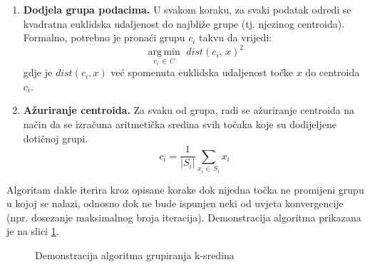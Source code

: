 \documentclass[times, utf8, zavrsni]{fer}
\begin{document}
\begin{enumerate}
\item \textbf{Dodjela grupa podacima.} U svakom koraku, za svaki podatak odredi se kvadratna euklidska udaljenost do najbliže grupe (tj. njezinog centroida). Formalno, potrebno je pronaći grupu $c_{i}$ takvu da vrijedi:
\begin{equation}
{\displaystyle {\underset{{c_i}\,\in\,C}{\operatorname {arg\,min}}}\,\,dist({c_i},\,x)^2}
\end{equation}
gdje je $dist(c_i, x)$ već spomenuta euklidska udaljenost točke $x$ do centroida $c_i$.
\item \textbf{Ažuriranje centroida.} Za svaku od grupa, radi se ažuriranje centroida na način da se izračuna aritmetička sredina svih točaka koje su dodijeljene dotičnoj grupi.
\begin{equation}
{\displaystyle {c_i}}=\frac{1}{|S_i|} \sum_{x_i\in\,S_i}^{} x_i
\end{equation}
\end{enumerate}
Algoritam dakle iterira kroz opisane korake dok nijedna točka ne promijeni grupu u kojoj se nalazi, odnosno dok ne bude ispunjen neki od uvjeta konvergencije (npr. dosezanje maksimalnog broja iteracija). Demonstracija algoritma prikazana je na slici
\ref{img:clustering_alg}.

\begin{figure}
\caption{Demonstracija algoritma grupiranja k-sredina}
\label{img:clustering_alg}
\end{figure}
\end{document}
